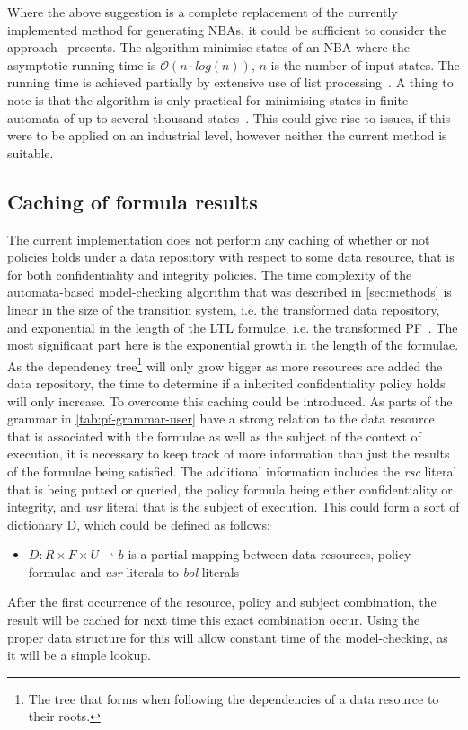 Where the above suggestion is a complete replacement of the currently implemented method for generating NBAs, it could be sufficient to consider the approach~\cite{hopcroft1971n} presents. The algorithm minimise states of an NBA where the asymptotic running time is $\mathcal{O}(n \cdot log(n))$, $n$ is the number of input states. The running time is achieved partially by extensive use of list processing~\cite{hopcroft1971n}. A thing to note is that the algorithm is only practical for minimising states in finite automata of up to several thousand states~\cite{hopcroft1971n}. This could give rise to issues, if this were to be applied on an industrial level, however neither the current method is suitable.

\subsection{Caching of formula results}\label{sec:cache}
The current implementation does not perform any caching of whether or not policies holds under a data repository with respect to some data resource, that is for both confidentiality and integrity policies. The time complexity of the automata-based model-checking algorithm that was described in \autoref{sec:methods} is linear in the size of the transition system, i.e. the transformed data repository, and exponential in the length of the LTL formulae, i.e. the transformed PF~\cite{baier2008principles}. The most significant part here is the exponential growth in the length of the formulae. As the dependency tree\footnote{The tree that forms when following the dependencies of a data resource to their roots.} will only grow bigger as more resources are added the data repository, the time to determine if a inherited confidentiality policy holds will only increase. To overcome this caching could be introduced. As parts of the grammar in \autoref{tab:pf-grammar-user} have a strong relation to the data resource that is associated with the formulae as well as the subject of the context of execution, it is necessary to keep track of more information than just the results of the formulae being satisfied. The additional information includes the \emph{rsc} literal that is being putted or queried, the policy formula being either confidentiality or integrity, and \emph{usr} literal that is the subject of execution. This could form a sort of dictionary D, which could be defined as follows:
\begin{itemize}
    \item $D : R \times F \times U \rightharpoonup b$ is a partial mapping between data resources, policy formulae and \emph{usr} literals to \emph{bol} literals
\end{itemize}
After the first occurrence of the resource, policy and subject combination, the result will be cached for next time this exact combination occur. Using the proper data structure for this will allow constant time of the model-checking, as it will be a simple lookup.

